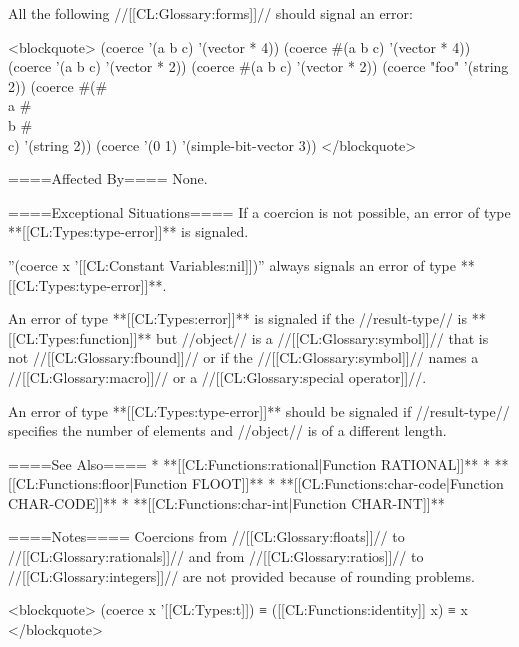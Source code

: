 All the following //[[CL:Glossary:forms]]// should signal an error:

<blockquote> 
(coerce '(a b c) '(vector * 4)) 
(coerce #(a b c) '(vector * 4)) 
(coerce '(a b c) '(vector * 2)) 
(coerce #(a b c) '(vector * 2)) 
(coerce "foo" '(string 2)) 
(coerce #(#\\a #\\b #\\c) '(string 2)) 
(coerce '(0 1) '(simple-bit-vector 3)) 
</blockquote>

====Affected By====
None.

====Exceptional Situations====
If a coercion is not possible, an error of type **[[CL:Types:type-error]]** is signaled.

''(coerce x '[[CL:Constant Variables:nil]])'' always signals an error of type **[[CL:Types:type-error]]**.

An error of type **[[CL:Types:error]]** is signaled if the //result-type// is **[[CL:Types:function]]** but //object// is a //[[CL:Glossary:symbol]]// that is not //[[CL:Glossary:fbound]]// or if the //[[CL:Glossary:symbol]]// names a //[[CL:Glossary:macro]]// or a //[[CL:Glossary:special operator]]//.

An error of type **[[CL:Types:type-error]]** should be signaled if //result-type// specifies the number of elements and //object// is of a different length.

====See Also====
  * **[[CL:Functions:rational|Function RATIONAL]]**
  * **[[CL:Functions:floor|Function FLOOT]]**
  * **[[CL:Functions:char-code|Function CHAR-CODE]]**
  * **[[CL:Functions:char-int|Function CHAR-INT]]**

====Notes====
Coercions from //[[CL:Glossary:floats]]// to //[[CL:Glossary:rationals]]// and from //[[CL:Glossary:ratios]]// to //[[CL:Glossary:integers]]// are not provided because of rounding problems.

<blockquote> 
(coerce x '[[CL:Types:t]]) 
  ≡ ([[CL:Functions:identity]] x) 
  ≡ x 
</blockquote>

      
